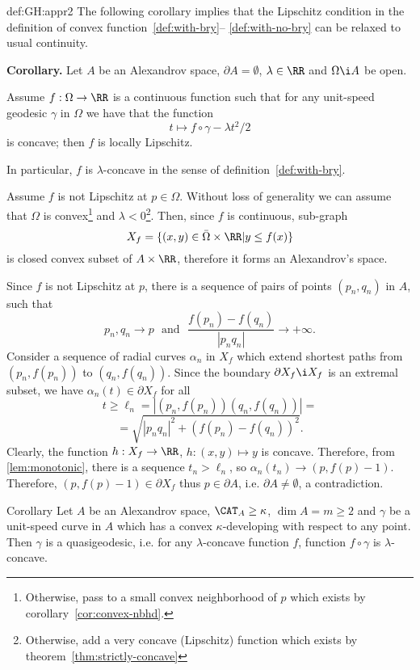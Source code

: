 {\begin{subthm}{def:GH:appr2}
The following corollary implies that the Lipschitz condition in the definition of
convex function~\ref{def:with-bry}-- \ref{def:with-no-bry} can be relaxed to usual continuity.

\begin{thm}{\bf Corollary.}\label{cor:cont-conv} Let $A$ be an Alexandrov space, $\partial A=\emptyset$,
$\lambda\in\RR$ and $\Omega\i A$ be open.

Assume $f:\Omega\to\RR$ is a continuous function such that for any unit-speed geodesic $\gamma$ in $\Omega$ we have that the function
$$t\mapsto f\circ\gamma-\lambda t^2/2$$
is concave; then $f$ is locally Lipschitz.
 
In particular, $f$ is $\lambda$-concave in the sense of
definition~\ref{def:with-bry}.
\end{thm}

 Assume $f$ is not Lipschitz at $p\in \Omega$.
Without loss of generality we can assume that $\Omega$ is
convex\footnote{Otherwise, pass to a small convex neighborhood of $p$ which
exists by corollary~\ref{cor:convex-nbhd}.} and
$\lambda<0$\footnote{Otherwise, add a very concave (Lipschitz) function which
exists by theorem~\ref{thm:strictly-concave}}.
Then, since $f$ is continuous, sub-graph
$$X_f=\{(x,y)\in \bar\Omega\times\RR|y\le f(x)\}$$
is closed convex subset of $A\times\RR$, therefore it forms an Alexandrov's
space. 

Since $f$ is not Lipschitz at $p$, there is a sequence of pairs of points
$(p_n,q_n)$ in $A$, such that 
$$p_n,q_n\to p\ \ \ \text{and}\ \ \  \frac{f(p_n)-f(q_n)}{|p_n
q_n|}\to+\infty.$$ 
Consider a sequence of radial curves $\alpha_n$ in $X_f$ which extend  shortest
paths from $(p_n,f(p_n))$ to $(q_n,f(q_n))$.
Since the boundary $\partial X_f\i X_f$ is an extremal subset, we have $\alpha_n(t)\in
\partial X_f$ for all 
$$t\ge \ell_n=|(p_n,f(p_n))(q_n,f(q_n))|=$$
$$=\sqrt{|p_n
q_n|^2+(f(p_n)-f(q_n))^2}.$$ 
Clearly, the function $h:X_f\to\RR$, $h:(x,y)\mapsto y$ is concave.
Therefore, from \ref{lem:monotonic}, there is a sequence $t_n>\ell_n$, so
$\alpha_n(t_n)\to (p,f(p)-1)$.
Therefore, $(p,f(p)-1)\in\partial X_f$ thus $p\in\partial A$, i.e. $\partial A\not=\emptyset$, a
contradiction.
\qeds



\begin{thm}{Corollary} \label{cor:eq-qg}
Let $A$ be an Alexandrov space, $\CAT_A\ge\kappa$, $\dim A=m\ge2$ and $\gamma$ be a unit-speed curve in $A$
which has a convex $\kappa$-developing with respect to any point.
Then $\gamma$ is a quasigeodesic, i.e. for any $\lambda$-concave function $f$,
function $f\circ\gamma$ is $\lambda$-concave.
\end{thm}


\end{subthm}}
